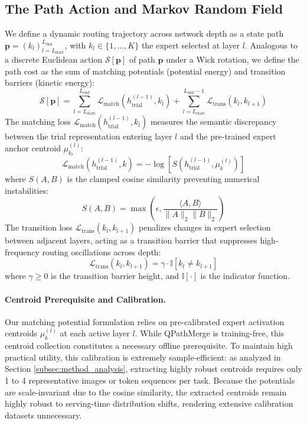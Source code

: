 \subsection{The Path Action and Markov Random Field}
We define a dynamic routing trajectory across network depth as a state path
$\mathbf{p} = (k_l)_{l=L_{\text{start}}}^{L_{\text{end}}}$,
with $k_l \in \{1, \dots, K\}$
the expert selected at layer $l$. Analogous to a discrete Euclidean action
$\mathcal{S}[\mathbf{p}]$ of path $\mathbf{p}$ under a Wick rotation, we define
the path cost as the sum of matching potentials (potential energy) and transition
barriers (kinetic energy):
\begin{equation}
    \mathcal{S}[\mathbf{p}] = \sum_{l=L_{\text{start}}}^{L_{\text{end}}} \mathcal{L}_{\text{match}}(h_{\text{trial}}^{(l-1)}, k_l) + \sum_{l=L_{\text{start}}}^{L_{\text{end}}-1} \mathcal{L}_{\text{trans}}(k_l, k_{l+1})
\end{equation}
The matching loss $\mathcal{L}_{\text{match}}(h_{\text{trial}}^{(l-1)}, k_l)$ measures the semantic discrepancy between the trial representation entering layer $l$ and the pre-trained expert anchor centroid $\mu_{k_l}^{(l)}$:
\begin{equation}
    \mathcal{L}_{\text{match}}(h_{\text{trial}}^{(l-1)}, k) = -\log \left[ S(h_{\text{trial}}^{(l-1)}, \mu_k^{(l)}) \right]
\end{equation}
where $S(A, B)$ is the clamped cosine similarity preventing numerical instabilities:
\begin{equation}
    S(A, B) = \max \left( \epsilon, \frac{\langle A, B \rangle}{\|A\|_2 \|B\|_2} \right)
\end{equation}
The transition loss $\mathcal{L}_{\text{trans}}(k_l, k_{l+1})$ penalizes changes in expert selection between adjacent layers, acting as a transition barrier that suppresses high-frequency routing oscillations across depth:
\begin{equation}
    \mathcal{L}_{\text{trans}}(k_l, k_{l+1}) = \gamma \cdot \mathbb{I}[k_l \ne k_{l+1}]
\end{equation}
where $\gamma \ge 0$ is the transition barrier height, and $\mathbb{I}[\cdot]$ is the indicator function.

\paragraph{Centroid Prerequisite and Calibration.}
Our matching potential formulation relies on pre-calibrated expert activation centroids $\mu_k^{(l)}$ at each active layer $l$. While QPathMerge is training-free, this centroid collection constitutes a necessary offline prerequisite. To maintain high practical utility, this calibration is extremely sample-efficient: as analyzed in Section \ref{subsec:method_analysis}, extracting highly robust centroids requires only 1 to 4 representative images or token sequences per task. Because the potentials are scale-invariant due to the cosine similarity, the extracted centroids remain highly robust to serving-time distribution shifts, rendering extensive calibration datasets unnecessary.

